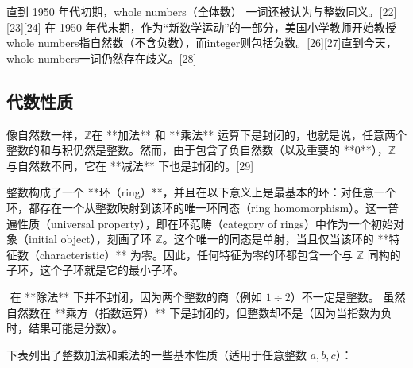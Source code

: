 直到 1950 年代初期，whole numbers（全体数） 一词还被认为与整数同义。[22][23][24]
在 1950 年代末期，作为“新数学运动”的一部分，美国小学教师开始教授whole numbers指自然数（不含负数），而integer则包括负数。[26][27]直到今天，whole numbers一词仍然存在歧义。[28]
\subsection{代数性质}
像自然数一样，$\mathbb{Z}$在 **加法** 和 **乘法** 运算下是封闭的，也就是说，任意两个整数的和与积仍然是整数。然而，由于包含了负自然数（以及重要的 **0**），$\mathbb{Z}$ 与自然数不同，它在 **减法** 下也是封闭的。[29]

整数构成了一个 **环（ring）**，并且在以下意义上是最基本的环：对任意一个环，都存在一个从整数映射到该环的唯一环同态（ring homomorphism）。这一普遍性质（universal property），即在环范畴（category of rings）中作为一个初始对象（initial object），刻画了环 $\mathbb{Z}$。这个唯一的同态是单射，当且仅当该环的 **特征数（characteristic）** 为零。因此，任何特征为零的环都包含一个与 $\mathbb{Z}$ 同构的子环，这个子环就是它的最小子环。

$$
\] 在 **除法** 下并不封闭，因为两个整数的商（例如 \(1 \div 2\)）不一定是整数。  
虽然自然数在 **乘方（指数运算）** 下是封闭的，但整数却不是（因为当指数为负时，结果可能是分数）。  

下表列出了整数加法和乘法的一些基本性质（适用于任意整数 \(a, b, c\)）：  

